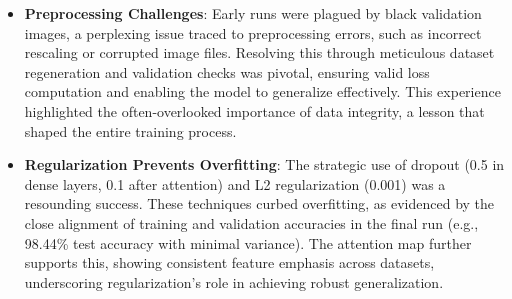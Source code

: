 \documentclass[12pt]{article}
\begin{document}
\begin{itemize}
    \item \textbf{Preprocessing Challenges}: Early runs were plagued by black validation images, a perplexing issue traced to preprocessing errors, such as incorrect rescaling or corrupted image files. Resolving this through meticulous dataset regeneration and validation checks was pivotal, ensuring valid loss computation and enabling the model to generalize effectively. This experience highlighted the often-overlooked importance of data integrity, a lesson that shaped the entire training process.
    \item \textbf{Regularization Prevents Overfitting}: The strategic use of dropout (0.5 in dense layers, 0.1 after attention) and L2 regularization (0.001) was a resounding success. These techniques curbed overfitting, as evidenced by the close alignment of training and validation accuracies in the final run (e.g., 98.44\% test accuracy with minimal variance). The attention map further supports this, showing consistent feature emphasis across datasets, underscoring regularization's role in achieving robust generalization.
\end{itemize}
\end{document}
